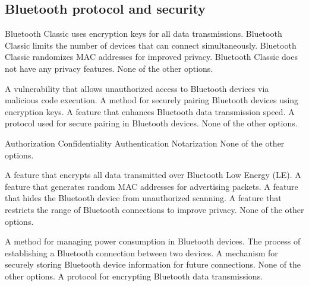 \subsection{Bluetooth protocol and security}

\begin{checkboxes}
    \choice Bluetooth Classic uses encryption keys for all data transmissions.
    \choice Bluetooth Classic limits the number of devices that can connect simultaneously.
    \choice Bluetooth Classic randomizes MAC addresses for improved privacy.
    \CorrectChoice Bluetooth Classic does not have any privacy features.
    \choice None of the other options.
\end{checkboxes}

\begin{checkboxes}
    \choice A vulnerability that allows unauthorized access to Bluetooth devices via malicious code execution.
    \choice A method for securely pairing Bluetooth devices using encryption keys.
    \choice A feature that enhances Bluetooth data transmission speed.
    \choice A protocol used for secure pairing in Bluetooth devices.
    \CorrectChoice None of the other options.
\end{checkboxes}

\begin{checkboxes}
    \CorrectChoice Authorization
    \CorrectChoice Confidentiality
    \CorrectChoice Authentication
    \choice Notarization
    \choice None of the other options.
\end{checkboxes}



\begin{checkboxes}
    \choice A feature that encrypts all data transmitted over Bluetooth Low Energy (LE).
    \CorrectChoice A feature that generates random MAC addresses for advertising packets.
    \choice A feature that hides the Bluetooth device from unauthorized scanning.
    \choice A feature that restricts the range of Bluetooth connections to improve privacy.
    \choice None of the other options.
\end{checkboxes}


\begin{checkboxes}
    \choice A method for managing power consumption in Bluetooth devices.
    \CorrectChoice The process of establishing a Bluetooth connection between two devices.
    \choice A mechanism for securely storing Bluetooth device information for future connections.
    \choice None of the other options.
    \choice A protocol for encrypting Bluetooth data transmissions.
\end{checkboxes}


